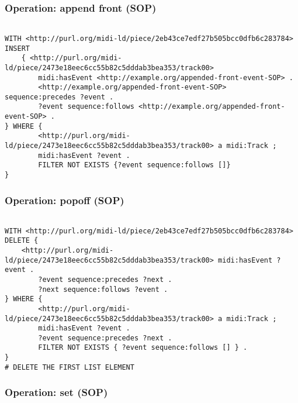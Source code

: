 \subsubsection{Operation: append front (SOP)}
\label{query:SOP:append_front}

\begin{lstlisting}[language=sparql]

WITH <http://purl.org/midi-ld/piece/2eb43ce7edf27b505bcc0dfb6c283784>
INSERT
	{ <http://purl.org/midi-ld/piece/2473e18eec6cc55b82c5dddab3bea353/track00>
		midi:hasEvent <http://example.org/appended-front-event-SOP> .
		<http://example.org/appended-front-event-SOP> sequence:precedes ?event .
		?event sequence:follows <http://example.org/appended-front-event-SOP> .
} WHERE	{  
		<http://purl.org/midi-ld/piece/2473e18eec6cc55b82c5dddab3bea353/track00> a midi:Track ;
		midi:hasEvent ?event .
		FILTER NOT EXISTS {?event sequence:follows []}
}

\end{lstlisting}

\subsubsection{Operation: popoff (SOP)}
\label{query:SOP:popoff}

\begin{lstlisting}[language=sparql]

WITH <http://purl.org/midi-ld/piece/2eb43ce7edf27b505bcc0dfb6c283784>
DELETE {
	<http://purl.org/midi-ld/piece/2473e18eec6cc55b82c5dddab3bea353/track00> midi:hasEvent ?event .
		?event sequence:precedes ?next .
		?next sequence:follows ?event .
} WHERE	{  
		<http://purl.org/midi-ld/piece/2473e18eec6cc55b82c5dddab3bea353/track00> a midi:Track ;
		midi:hasEvent ?event .
		?event sequence:precedes ?next .
		FILTER NOT EXISTS { ?event sequence:follows [] } .
}
# DELETE THE FIRST LIST ELEMENT

\end{lstlisting}

\subsubsection{Operation: set (SOP)}
\label{query:SOP:set}

